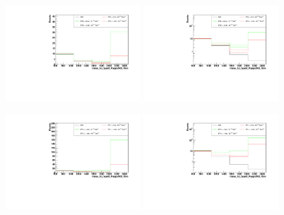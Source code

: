 \begin{figure}[h]
  \begin{center}
	\includegraphics[width=0.45\textwidth]{Plots/aQGC_kinematics/mass_lvj_type0_PuppiAK8_4bin_FT0.pdf}%
	\includegraphics[width=0.45\textwidth]{Plots/aQGC_kinematics/mass_lvj_type0_PuppiAK8_4bin_FT0_log.pdf}\\	
    \caption{}
  \end{center}
\end{figure}
\begin{figure}[h]
  \begin{center}
	\includegraphics[width=0.45\textwidth]{Plots/aQGC_kinematics/mass_lvj_type0_PuppiAK8_4bin_FT1.pdf}%
	\includegraphics[width=0.45\textwidth]{Plots/aQGC_kinematics/mass_lvj_type0_PuppiAK8_4bin_FT1_log.pdf}\\	
    \caption{}
  \end{center}
\end{figure}
